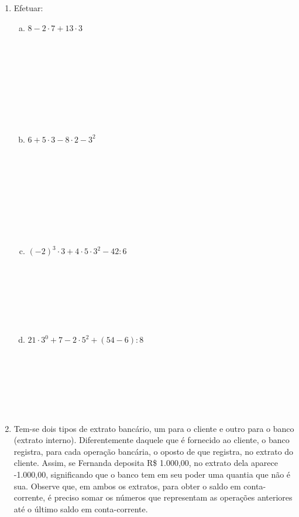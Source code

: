 \documentclass[a4paper,14pt]{article}
\begin{document}
\begin{multicols}{2}
\begin{enumerate}
\begin{enumerate}[a)]
			\end{enumerate}
			\item Efetuar:
			\begin{enumerate}[a)]
				\item $8 - 2 \cdot 7 + 13 \cdot 3$ \\\\\\\\\\\\\\\\\\
				\item $6 + 5 \cdot 3 - 8 \cdot 2 - 3^2$ \\\\\\\\\\\\\\\\\\
				\item $(-2)^3 \cdot 3 + 4 \cdot 5 \cdot 3^2 - 42 : 6$ \\\\\\\\\\\\\\
				\item $21 \cdot 3^0 + 7 - 2 \cdot 5^2 + (54 - 6) : 8$ \\\\\\\\\\\\\\
			\end{enumerate}
			\item Tem-se dois tipos de extrato bancário, um para o cliente e outro para o banco (extrato interno). Diferentemente daquele que é fornecido ao cliente, o banco registra, para cada operação bancária, o oposto de que registra, no extrato do cliente. Assim, se Fernanda deposita R\$ 1.000,00, no extrato dela aparece -1.000,00, significando que o banco tem em seu poder uma quantia que não é sua. Observe que, em ambos os extratos, para obter o saldo em conta-corrente, é preciso somar os números que representam as operações anteriores até o último saldo em conta-corrente. \\

\end{enumerate}
\end{multicols}
\end{document}
